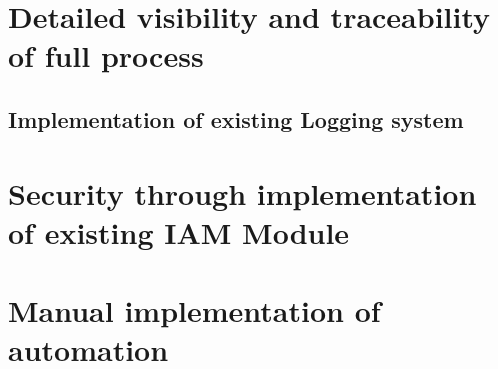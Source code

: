 \section{Detailed visibility and traceability of full process}

\subsection{Implementation of existing Logging system}

\section{Security through implementation of existing IAM Module}

\section{Manual implementation of automation}
